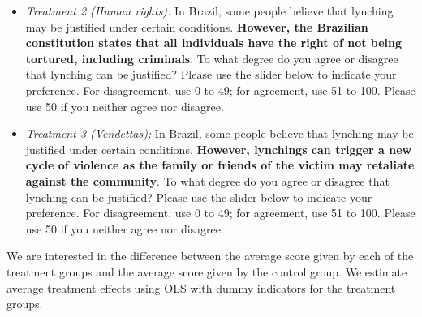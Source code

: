 \documentclass[12pt,a4paper]{article}
\providecommand{\tightlist}{%
   \setlength{\itemsep}{0pt}\setlength{\parskip}{0pt}}
\begin{document}
\begin{itemize}
\tightlist
\item
  \emph{Treatment 2 (Human rights):} In Brazil, some people believe that lynching may be justified under certain conditions. \textbf{However, the Brazilian constitution states that all individuals have the right of not being tortured, including criminals}. To what degree do you agree or disagree that lynching can be justified? Please use the slider below to indicate your preference. For disagreement, use 0 to 49; for agreement, use 51 to 100. Please use 50 if you neither agree nor disagree.
\end{itemize}

\begin{itemize}
\tightlist
\item
  \emph{Treatment 3 (Vendettas):} In Brazil, some people believe that lynching may be justified under certain conditions. \textbf{However, lynchings can trigger a new cycle of violence as the family or friends of the victim may retaliate against the community}. To what degree do you agree or disagree that lynching can be justified? Please use the slider below to indicate your preference. For disagreement, use 0 to 49; for agreement, use 51 to 100. Please use 50 if you neither agree nor disagree.
\end{itemize}

We are interested in the difference between the average score given by each of
the treatment groups and the average score given by the control group. We
estimate average treatment effects using OLS with dummy indicators for the
treatment groups.

\vspace{.5cm}
\end{document}
